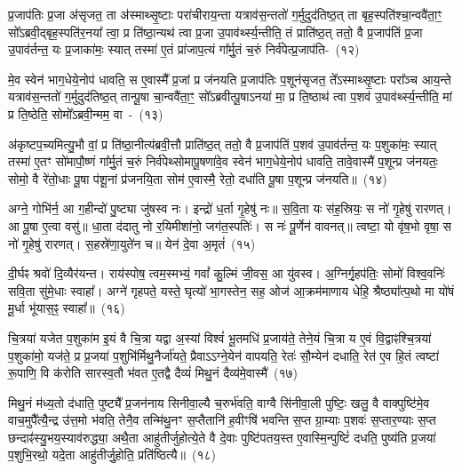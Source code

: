 प्र॒जा\-प॑तिः प्र॒जा अ॑सृजत॒ ता अ॑स्माथ्सृ॒ष्टाः परा॑चीराय॒न्ता यत्राव॑स॒न्ततो॑ ग॒र्मुदुद॑तिष्ठ॒त् ता बृह॒स्पति॑श्चा॒न्ववै॑ता॒ꣳ॒ सो᳚\-ऽब्रवी॒द्बृह॒स्पति॑र॒नया᳚ त्वा॒ प्र ति॑ष्ठा॒न्यथ॑ त्वा प्र॒जा उ॒पाव॑र्थ्स्य॒न्तीति॒ तं प्राति॑ष्ठ॒त् ततो॒ वै प्र॒जा\-प॑तिं प्र॒जा उ॒पाव॑र्तन्त॒ यः प्र॒जाका॑मः॒ स्यात् तस्मा॑ ए॒तं प्रा॑जाप॒त्यं गा᳚र्मु॒तं च॒रुं निर्व॑पेत्प्र॒जा\-प॑ति-~(१२)\ip

मे॒व स्वेन॑ भाग॒धेये॒नोप॑ धावति॒ स ए॒वास्मै᳚ प्र॒जां प्र ज॑नयति प्र॒जा\-प॑तिः प॒शून॑सृजत॒ ते᳚\-ऽस्माथ्सृ॒ष्टाः परा᳚ञ्च आय॒न्ते यत्राव॑स॒न्ततो॑ ग॒र्मुदुद॑तिष्ठ॒त् तान्पू॒षा चा॒न्ववै॑ता॒ꣳ॒ सो᳚\-ऽब्रवीत्पू॒षा\-ऽनया॑ मा॒ प्र ति॒ष्ठाथ॑ त्वा प॒शव॑ उ॒पाव॑र्थ्स्य॒न्तीति॒ मां प्र ति॒ष्ठेति॒ सोमो᳚\-ऽब्रवी॒न्मम॒ \mbox{वा~-~(१३)\ip}

अ॑कृष्टप॒च्यमित्यु॒भौ वां॒ प्र ति॑ष्ठा॒नीत्य॑ब्रवी॒त्तौ प्राति॑ष्ठ॒त् ततो॒ वै प्र॒जा\-प॑तिं प॒शव॑ उ॒पाव॑र्तन्त॒ यः प॒शुका॑मः॒ स्यात् तस्मा॑ ए॒तꣳ सो॑मापौ॒ष्णं गा᳚र्मु॒तं च॒रुं निर्व॑पेथ्सोमापू॒षणा॑वे॒व स्वेन॑ भाग॒धेये॒नोप॑ धावति॒ तावे॒वास्मै॑ प॒शून्प्र ज॑नयतः॒ सोमो॒ वै रे॑तो॒धाः पू॒षा प॑शू॒नां प्र॑जनयि॒ता सोम॑ ए॒वास्मै॒ रेतो॒ दधा॑ति पू॒षा प॒शून्प्र ज॑नयति॥~(१४)\ip

{\anuvakamend[{व॒पे॒त्प्र॒जा\-प॑तिं॒ वै दधा॑ति पू॒षा त्रीणि॑ च}]}

अग्ने॒ गोभि॑र्न॒ आ ग॒हीन्दो॑ पु॒ष्ट्या जु॑षस्व नः। इन्द्रो॑ ध॒र्ता गृ॒हेषु॑ नः॥ स॒वि॒ता यः स॑ह॒स्रियः॒ स नो॑ गृ॒हेषु॑ रारणत्। आ पू॒षा ए॒त्वा वसु॑॥ धा॒ता द॑दातु नो र॒यिमीशा॑नो॒ जग॑त॒स्पतिः॑। स नः॑ पू॒र्णेन॑ वावनत्॥ त्वष्टा॒ यो वृ॑ष॒भो वृषा॒ स नो॑ गृ॒हेषु॑ रारणत्। स॒हस्रे॑णा॒युते॑न च॥ येन॑ दे॒वा अ॒मृतं॑~(१५)\ip

दी॒र्घꣴ श्रवो॑ दि॒व्यैर॑यन्त। राय॑स्पोष॒ त्वम॒स्मभ्यं॒ गवां᳚ कु॒ल्मिं जी॒वस॒ आ यु॑वस्व। अ॒ग्निर्गृ॒हप॑तिः॒ सोमो॑ विश्व॒वनिः॑ सवि॒ता सु॑\-मे॒धाः स्वाहा᳚। अग्ने॑ गृहपते॒ यस्ते॒ घृत्यो॑ भा॒गस्तेन॒ सह॒ ओज॑ आ॒\-क्रम॑\-मा\-णाय धेहि॒ श्रैष्ठ्या᳚त्प॒थो मा यो॑षं मू॒र्धा भू॑यास॒ꣴ॒ स्वाहा᳚॥~(१६)\ip

{\anuvakamend[{अ॒मृत॑म॒ष्टात्रिꣳ॑शच्च}]}

चि॒त्रया॑ यजेत प॒शुका॑म इ॒यं वै चि॒त्रा यद्वा अ॒स्यां विश्वं॑ भू॒तमधि॑ प्र॒जाय॑ते॒ तेने॒यं चि॒त्रा य ए॒वं वि॒द्वाꣴश्चि॒त्रया॑ प॒शुका॑मो॒ यज॑ते॒ प्र प्र॒जया॑ प॒शुभि॑र्मिथु॒नैर्जा॑यते॒ प्रैवा\-ऽऽ\-ग्ने॒येन॑ वापयति॒ रेतः॑ सौ॒म्येन॑ दधाति॒ रेत॑ ए॒व हि॒तं त्वष्टा॑ रू॒पाणि॒ वि क॑रोति सारस्व॒तौ भ॑वत ए॒तद्वै दैव्यं॑ मिथु॒नं दैव्य॑मे॒वास्मै॑~(१७)\ip

मिथु॒नं म॑ध्य॒तो द॑धाति॒ पुष्ट्यै᳚ प्र॒जन॑नाय सिनीवा॒ल्यै च॒रुर्भ॑वति॒ वाग्वै सि॑नीवा॒ली पुष्टिः॒ खलु॒ वै वाक्पुष्टि॑मे॒व वाच॒मुपै᳚त्यै॒न्द्र उ॑त्त॒मो भ॑वति॒ तेनै॒व तन्मि॑थु॒नꣳ स॒प्तैतानि॑ ह॒वीꣳषि॑ भवन्ति स॒प्त ग्रा॒म्याः प॒शवः॑ स॒प्तार॒ण्याः स॒प्त छन्दाꣴ॑स्यु॒भय॒स्याव॑रुद्ध्या॒ अथै॒ता आहु॑तीर्जुहोत्ये॒ते वै दे॒वाः पुष्टि॑पतय॒स्त ए॒वास्मि॒न्पुष्टिं॑ दधति॒ पुष्य॑ति प्र॒जया॑ प॒शुभि॒रथो॒ यदे॒ता आहु॑तीर्जु॒होति॒ प्रति॑ष्ठित्यै॥~(१८)\ip


